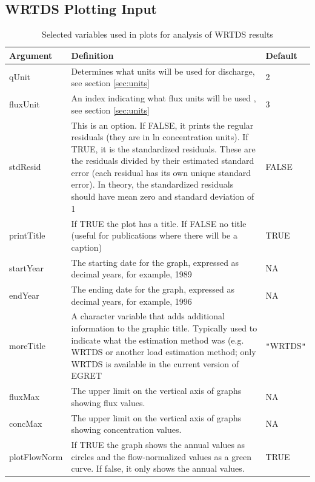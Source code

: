 \documentclass[a4paper,11pt]{article}\usepackage[]{graphicx}\usepackage[]{color}
\begin{document}
\FloatBarrier
\clearpage

\subsection{WRTDS Plotting Input}
\label{sec:wrtdsOutputVariables}

\begin{table}[ht]
\caption{Selected variables used in plots for analysis of WRTDS results 
\label{tab:wrtdsVariables}}
\begin{tabularx}{\textwidth}{lXl}
\hline
  \textbf{Argument} & \textbf{Definition} & \textbf{Default} \\
\hline
qUnit & Determines what units will be used for discharge, see section \ref{sec:units} & 2\\
fluxUnit & An index indicating what flux units will be used , see section \ref{sec:units} & 3\\
stdResid & This is an option.  If FALSE, it prints the regular residuals (they are in ln concentration units).  If TRUE, it is the standardized residuals.  These are the residuals divided by their estimated standard error (each residual has its own unique standard error).  In theory, the standardized residuals should have mean zero and standard deviation of 1 & FALSE\\
printTitle & If TRUE the plot has a title.  If FALSE no title (useful for publications where there will be a caption) & TRUE\\
startYear & The starting date for the graph, expressed as decimal years, for example, 1989 & NA\\
endYear & The ending date for the graph, expressed as decimal years, for example, 1996 & NA\\
moreTitle & A character variable that adds additional information to the graphic title.  Typically used to indicate what the estimation method was (e.g. WRTDS or another load estimation method; only WRTDS is available in the current version of EGRET & \texttt{"}WRTDS\texttt{"}\\
fluxMax & The upper limit on the vertical axis of graphs showing flux values. & NA\\
concMax & The upper limit on the vertical axis of graphs showing concentration values. & NA\\
plotFlowNorm & If TRUE the graph shows the annual values as circles and the flow-normalized values as a green curve.  If false, it only shows the annual values. & TRUE\\
\hline
\end{tabularx}

\end{table}
\end{document}
